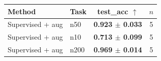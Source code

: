 \begin{tabular}{llcc}
\toprule
Method & Task & test\_acc $\uparrow$ & $n$ \\
\midrule
Supervised + aug & n50 & \textbf{0.923 $\pm$ 0.033} & 5 \\
\midrule
Supervised + aug & n10 & \textbf{0.713 $\pm$ 0.099} & 5 \\
\midrule
Supervised + aug & n200 & \textbf{0.969 $\pm$ 0.014} & 5 \\
\bottomrule
\end{tabular}
